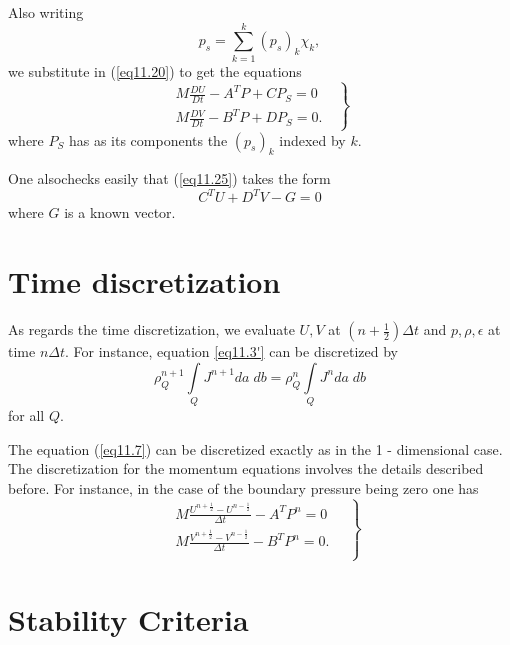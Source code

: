 Also writing 
\begin{equation*}
p_s = \sum\limits^k_{k=1} (p_s)_k \chi_k, 
\tag{11.26}\label{eq11.26}
\end{equation*}
we substitute in (\ref{eq11.20}) to get the equations 
\begin{equation*}
\left. 
\begin{aligned}
M \frac{DU}{Dt} - A^T P + C P_S = 0 \quad \\
M \frac{DV}{Dt} - B^T P + D P_S = 0.
\end{aligned}
\right\}
\tag{11.27}\label{eq11.27}
\end{equation*}
where $P_S$ has as its components the $(p_s)_k$ indexed by $k$. 

One also\pageoriginale checks easily that (\ref{eq11.25}) takes the form 
\begin{equation*}
C^T U + D^T V  - G = 0\tag{11.28}\label{eq11.28}
\end{equation*}
where $G$ is a known vector. 

\section{Time discretization}\label{chap11:sec11.6}

As regards the time discretization, we evaluate $U,V$ at $(n+\frac{1}{2}) \Delta t$ and $p, \rho, \epsilon$ at time $n \Delta t$. For instance, equation \ref{eq11.3'} can be discretized by 
\begin{equation*}
\rho^{n+1}_Q \int\limits_Q J^{n+1} da \; db = \rho^n _Q \int\limits_Q J^n da \; db 
\tag{11.29}\label{eq11.29}
\end{equation*}
for all $Q$. 

The equation (\ref{eq11.7}) can be discretized exactly as in the
1 - dimensional case. The discretization for the momentum equations
involves the details described before. For instance, in the case of
the boundary pressure being zero one has  
\begin{equation*}
\left. 
\begin{aligned}
& M  \frac{U^{n+\frac{1}{2}} - U^{n-\frac{1}{2}}}{\Delta t} - A^T P^n = 0 \quad \\
& M  \frac{V^{n+\frac{1}{2}} - V^{n-\frac{1}{2}}}{\Delta t} - B^T P^n = 0. \quad \\
\end{aligned}
\right\} \tag{11.30}\label{eq11.30}
\end{equation*}

\section{Stability Criteria}\label{chap11:sec11.7}

